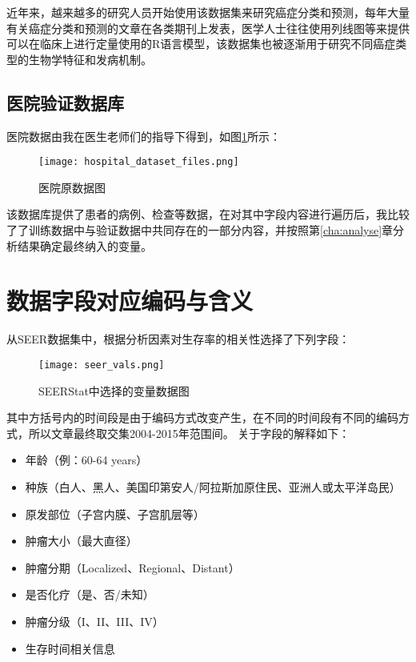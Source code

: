 近年来，越来越多的研究人员开始使用该数据集来研究癌症分类和预测，每年大量有关癌症分类和预测的文章在各类期刊上发表，医学人士往往使用列线图等来提供可以在临床上进行定量使用的R语言模型，该数据集也被逐渐用于研究不同癌症类型的生物学特征和发病机制。

\subsection{医院验证数据库}

医院数据由我在医生老师们的指导下得到，如图\ref{fig:dataset_test_file}所示：

\begin{figure}[!htbp]
    \centering
    \texttt{[image: hospital\_dataset\_files.png]}
    \caption{医院原数据图} \label{fig:dataset_test_file}
\end{figure}

该数据库提供了患者的病例、检查等数据，在对其中字段内容进行遍历后，我比较了了训练数据中与验证数据中共同存在的一部分内容，并按照第\ref{cha:analyse}章分析结果确定最终纳入的变量。

\section{数据字段对应编码与含义}

从SEER数据集中，根据分析因素对生存率的相关性选择了下列字段：

\begin{figure}[!htbp]
    \centering
    \texttt{[image: seer\_vals.png]}
    \caption{SEERStat中选择的变量数据图} \label{fig:seer_vals}
\end{figure}

其中方括号内的时间段是由于编码方式改变产生，在不同的时间段有不同的编码方式，所以文章最终取交集2004-2015年范围间。
关于字段的解释如下：

\begin{itemize}
  \item 年龄（例：60-64 years）
  \item 种族（白人、黑人、美国印第安人/阿拉斯加原住民、亚洲人或太平洋岛民）
  \item 原发部位（子宫内膜、子宫肌层等）
  \item 肿瘤大小（最大直径）
  \item 肿瘤分期（Localized、Regional、Distant）
  \item 是否化疗（是、否/未知）
  \item 肿瘤分级（I、II、III、IV）
  \item 生存时间相关信息
\end{itemize}

